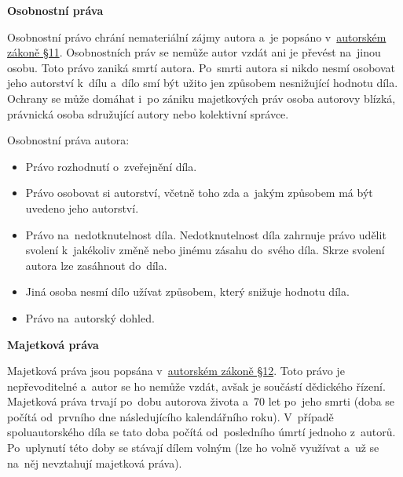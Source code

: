 \vspace{0,5cm}
\begin{Large}
\textbf{Osobnostní práva}
\end{Large}

Osobnostní právo chrání nemateriální zájmy autora a~je popsáno v~\href{https://www.zakonyprolidi.cz/cs/2000-121#p11}{autorském zákoně §11}. Osobnostních práv se nemůže autor vzdát ani je převést na~jinou osobu. Toto právo zaniká smrtí autora. Po~smrti autora si nikdo nesmí osobovat jeho autorství k~dílu a~dílo smí být užito jen způsobem nesnižující hodnotu díla. Ochrany se může domáhat i~po zániku majetkových práv osoba autorovy blízká, právnická osoba sdružující autory nebo kolektivní správce.


Osobnostní práva autora:
\begin{itemize} 
	\item Právo rozhodnutí o~zveřejnění díla.
	\item Právo osobovat si autorství, včetně toho zda a~jakým způsobem má být uvedeno jeho autorství.
	\item Právo na~nedotknutelnost díla. Nedotknutelnost díla zahrnuje právo udělit svolení k~jakékoliv změně nebo jinému zásahu do~svého díla. Skrze svolení autora lze zasáhnout do~díla.
	\item Jiná osoba nesmí dílo užívat způsobem, který snižuje hodnotu díla.
	\item Právo na~autorský dohled.
\end{itemize}


\vspace{0,5cm}
\begin{Large}
\textbf{Majetková práva}
\end{Large}

Majetková práva jsou popsána v~\href{https://www.zakonyprolidi.cz/cs/2000-121#p12}{autorském zákoně §12}. Toto právo je nepřevoditelné a~autor se ho nemůže vzdát, avšak je součástí dědického řízení.
Majetková práva trvají po~dobu autorova života a~70 let po~jeho smrti (doba se počítá od~prvního dne následujícího kalendářního roku). V~případě spoluautorského díla se tato doba počítá od~posledního úmrtí jednoho z~autorů. Po~uplynutí této doby se stávají dílem volným (lze ho volně využívat a~už se na~něj nevztahují majetková práva).

